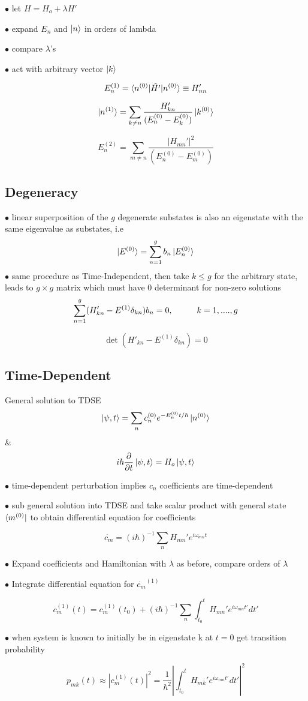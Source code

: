 \documentclass[table,cmyk]{article}
\begin{document}
\begin{longtable}
$\bullet$ let $H = H_o + \lambda H'$

$\bullet$ expand $E_n$ and $\ket{n}$ in orders of lambda

$\bullet$ compare $\lambda$'s

$\bullet$ act with arbitrary vector $\ket{k}$

\[E_n^{(1)} = \braket{n^{(0)}|\hat{H'}|n^{(0)}} \equiv H_{nn}'\]

\[ \ket{n^{(1)}} = \sum_{k\ne n} \frac{H_{kn}'}{(E_n^{(0)}-E_k^{(0)})}\ket{k^{(0)}}\]

\[E_n^{(2)} = \sum_{m\ne n} \frac{|H_{mn}'|^2}{(E_n^{(0)}-E_m^{(0)})}\]

\subsection*{Degeneracy}

$\bullet$ linear superposition of the $g$ degenerate substates is also an eigenstate with the same eigenvalue as substates, i.e
\[\ket{E^{(0)}} = \sum_{n=1}^{g} b_n\ket{E_n^{(0)}}\]
$\bullet$ same procedure as Time-Independent, then take $k \le g$ for the arbitrary state, leads to $g\times g$ matrix which must have $0$ determinant for non-zero solutions
\[ \sum_{n=1}^{g} (H'_{kn} - E^{(1)}\delta_{kn})b_n=0, \text{\hspace{1cm}} k = 1,....,g\]

\[\det(H'_{kn} - E^{(1)}\delta_{kn}) = 0\]

\subsection*{Time-Dependent}
General solution to TDSE
\[\ket{\psi, t} = \sum_{n } c_n^{(0)} e^{-E_n^{(0)}t/\hbar}\ket{n^{(0)}}\]
&
\[i\hbar\frac{\partial}{\partial t}\ket{\psi, t} = H_o \ket{\psi, t}\]

$\bullet$ time-dependent perturbation implies $c_n$ coefficients are time-dependent

$\bullet$ sub general solution into TDSE and take scalar product with general state $\bra{m^{(0)}}$ to obtain differential equation for coefficients

\[\dot{c_m} = (i\hbar)^{-1}\sum_{n }H_{mn}'e^{i\omega_{mn}t}\]

$\bullet$ Expand coefficients and Hamiltonian with $\lambda$ as before, compare orders of $\lambda$

$\bullet$ Integrate differential equation for $\dot{c_m}^{(1)}$

\[c_m^{(1)}(t) = c_m^{(1)}(t_0) + (i\hbar)^{-1}\sum_{n } \int_{t_0}^{t} H_{mn}'e^{i\omega_{mn}t'}dt'\]

$\bullet$ when system is known to initially be in eigenstate k at $t=0$ get transition probability

\[p_{mk}(t) \approx \left|c_m^{(1)}(t)\right|^2 = \frac{1}{\hbar^2}\left|\int_{t_0}^{t}H_{mk}'e^{i\omega_{mn}t'}dt'\right|^2\]

\tabularnewline\hline



\end{longtable}
\end{document}
